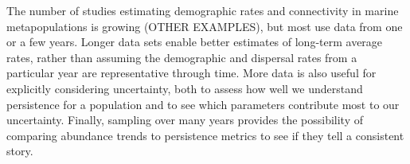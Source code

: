\documentclass[12pt, oneside]{article}   	%
\begin{document}

The number of studies estimating demographic rates and connectivity in marine metapopulations is growing \citep[e.g.][]{salles_coral_2015,johnson2018integrating} (OTHER EXAMPLES), but most use data from one or a few years. Longer data sets enable better estimates of long-term average rates, rather than assuming the demographic and dispersal rates from a particular year are representative through time. More data is also useful for explicitly considering uncertainty, both to assess how well we understand persistence for a population and to see which parameters contribute most to our uncertainty. Finally, sampling over many years provides the possibility of comparing abundance trends to persistence metrics to see if they tell a consistent story.

\end{document}
